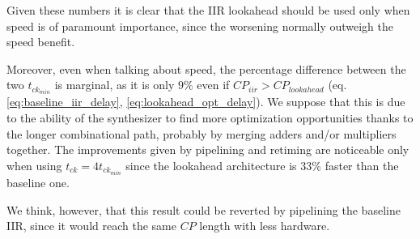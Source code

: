 Given these numbers it is clear that the IIR lookahead should be used only when speed is of paramount importance, since the worsening normally
outweigh the speed benefit.

Moreover, even when talking about speed, the percentage difference between the two $t_{ck_{min}}$ is marginal, as it is only $9\%$ even if
$CP_{iir} > CP_{lookahead}$ (eq. \ref{eq:baseline_iir_delay}, \ref{eq:lookahead_opt_delay}). We suppose that this is due to the ability of the
synthesizer to find more optimization opportunities thanks to the longer combinational path, probably by merging adders and/or multipliers together.
The improvements given by pipelining and retiming are noticeable only when using $t_{ck} = 4t_{ck_{min}}$ since the lookahead architecture is $33\%$ faster
than the baseline one.

We think, however, that this result could be reverted by pipelining the baseline IIR, since it would reach the same $CP$ length with less hardware.